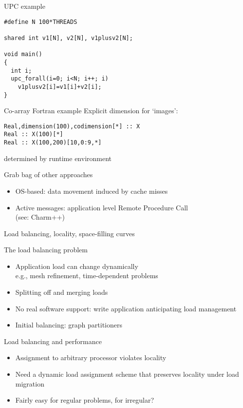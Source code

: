 \begin{numberedframe}{UPC example}
\begin{lstlisting}
#define N 100*THREADS

shared int v1[N], v2[N], v1plusv2[N];

void main()
{
  int i;
  upc_forall(i=0; i<N; i++; i)
    v1plusv2[i]=v1[i]+v2[i];
}
\end{lstlisting}
\end{numberedframe}

\begin{numberedframe}{Co-array Fortran example}
Explicit dimension for `images':
\begin{lstlisting}
Real,dimension(100),codimension[*] :: X
Real :: X(100)[*]
Real :: X(100,200)[10,0:9,*]
\end{lstlisting}
determined by runtime environment
\end{numberedframe}

\begin{numberedframe}{Grab bag of other approaches}
  \begin{itemize}
  \item OS-based: data movement induced by cache misses
  \item Active messages: application level Remote Procedure Call\\
    (see: Charm++)
  \end{itemize}
\end{numberedframe}

 {Load balancing, locality, space-filling curves}

\begin{numberedframe}{The load balancing problem}
  \begin{itemize}
  \item Application load can change dynamically\\
    e.g., mesh refinement, time-dependent problems
  \item Splitting off and merging loads 
  \item No real software support: write application anticipating load management
  \item Initial balancing: graph partitioners
  \end{itemize}
\end{numberedframe}

\begin{numberedframe}{Load balancing and performance}
  \begin{itemize}
  \item Assignment to arbitrary processor violates locality
  \item Need a dynamic load assignment scheme that preserves
    locality under load migration
  \item Fairly easy for regular problems, for irregular?
  \end{itemize}
\end{numberedframe}

